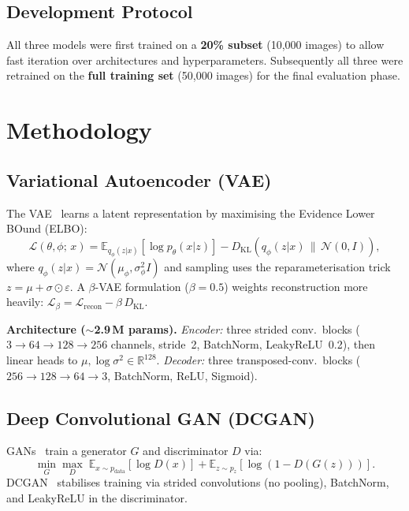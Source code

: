 \documentclass{llncs}
\begin{document}
\subsection*{Development Protocol}

All three models were first trained on a \textbf{20\% subset} (10,000
images) to allow fast iteration over architectures and hyperparameters.
Subsequently all three were retrained on the \textbf{full training set}
(50,000 images) for the final evaluation phase.

\section{Methodology}
\label{sec:method}

\subsection{Variational Autoencoder (VAE)}

The VAE~\cite{kingma2013} learns a latent representation by maximising the
Evidence Lower BOund (ELBO):
\begin{equation}
  \mathcal{L}(\theta,\phi;\,x) =
    \mathbb{E}_{q_\phi(z|x)}\!\left[\log p_\theta(x|z)\right]
    - D_{\mathrm{KL}}\!\left(q_\phi(z|x)\,\|\,\mathcal{N}(0,I)\right),
\end{equation}
where $q_\phi(z|x)=\mathcal{N}(\mu_\phi,\sigma^2_\phi I)$ and sampling uses
the reparameterisation trick $z=\mu+\sigma\odot\varepsilon$.
A $\beta$-VAE formulation ($\beta=0.5$) weights reconstruction more
heavily: $\mathcal{L}_\beta=\mathcal{L}_{\mathrm{recon}}-\beta\,D_{\mathrm{KL}}$.

\textbf{Architecture ($\sim$2.9\,M params).}
\textit{Encoder:} three strided conv.\ blocks
($3\!\to\!64\!\to\!128\!\to\!256$ channels, stride~2, BatchNorm,
LeakyReLU~0.2), then linear heads to
$\mu,\log\sigma^2\in\mathbb{R}^{128}$.
\textit{Decoder:} three transposed-conv.\ blocks
($256\!\to\!128\!\to\!64\!\to\!3$, BatchNorm, ReLU, Sigmoid).

\subsection{Deep Convolutional GAN (DCGAN)}

GANs~\cite{radford2015} train a generator $G$ and discriminator $D$ via:
\begin{equation}
  \min_G\max_D\;
  \mathbb{E}_{x\sim p_{\mathrm{data}}}\!\left[\log D(x)\right]
  +\mathbb{E}_{z\sim p_z}\!\left[\log(1-D(G(z)))\right].
\end{equation}
DCGAN~\cite{radford2015} stabilises training via strided convolutions
(no pooling), BatchNorm, and LeakyReLU in the discriminator.
\end{document}
